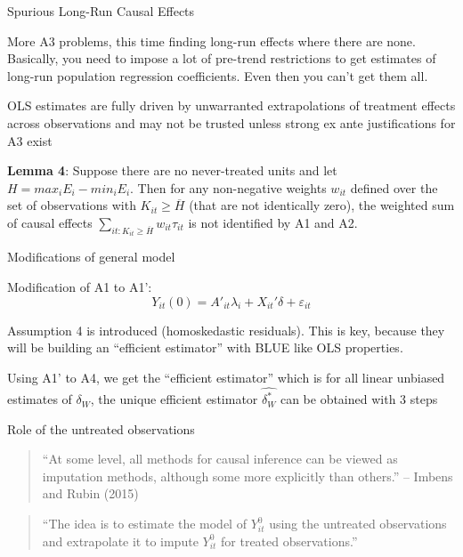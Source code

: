 \documentclass{beamer}
\begin{document}
\begin{frame}{Spurious Long-Run Causal Effects}

More A3 problems, this time finding long-run effects  where there are none. Basically, you need to impose a lot of pre-trend restrictions to get estimates of long-run population regression coefficients. Even then you can't get them all. 

\bigskip

OLS estimates are fully driven by unwarranted extrapolations of treatment effects across observations and may not be trusted unless strong ex ante justifications for A3 exist

\bigskip

\textbf{Lemma 4}: Suppose there are no never-treated units and let $H=max_i E_i - min_i E_i$. Then for any non-negative weights $w_{it}$ defined over the set of observations with $K_{it} \geq \overline{H}$ (that are not identically zero), the weighted sum of causal effects $\sum_{it:K_{it}\geq \overline{H}}w_{it} \tau_{it}$ is not identified by A1 and A2.

\end{frame}

\begin{frame}{Modifications of general model}


Modification of A1 to A1': $$ Y_{it}(0) = A'_{it} \lambda_i + X_{it}' \delta + \varepsilon_{it}$$

\bigskip

Assumption 4 is introduced (homoskedastic residuals).  This is key, because they will be building an ``efficient estimator'' with BLUE like OLS properties. 

\bigskip

Using A1' to A4, we get the ``efficient estimator'' which is for all linear unbiased estimates of $\delta_W$, the unique efficient estimator $\widehat{\delta_W^*}$ can be obtained with 3 steps

\end{frame}


\begin{frame}{Role of the untreated observations}

\begin{quote}
``At some level, all methods for causal inference can be viewed as imputation methods, although some more explicitly than others.'' -- Imbens and Rubin (2015)
\end{quote}

\bigskip

\begin{quote}
``The idea is to estimate the model of $Y_{it}^0$ using the untreated observations and extrapolate it to impute $Y_{it}^0$ for treated observations.''
\end{quote}


\end{frame}
\end{document}
